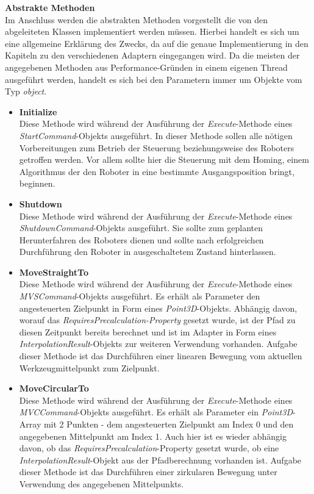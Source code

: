 \textbf{Abstrakte Methoden}\\
Im Anschluss werden die abstrakten Methoden vorgestellt die von den abgeleiteten Klassen implementiert werden müssen. Hierbei handelt es sich um eine allgemeine Erklärung des Zwecks, da auf die genaue Implementierung in den Kapiteln zu den verschiedenen Adaptern eingegangen wird. Da die meisten der angegebenen Methoden aus Performance-Gründen in einem eigenen Thread ausgeführt werden, handelt es sich bei den Parametern immer um Objekte vom Typ \textit{object}. 
\begin{itemize}
\item \textbf{Initialize}\\
Diese Methode wird während der Ausführung der \textit{Execute}-Methode eines \textit{StartCommand}-Objekts ausgeführt. In dieser Methode sollen alle nötigen Vorbereitungen zum Betrieb der Steuerung beziehungsweise des Roboters getroffen werden. Vor allem sollte hier die Steuerung mit dem Homing, einem Algorithmus der den Roboter in eine bestimmte Ausgangsposition bringt, beginnen.
\item \textbf{Shutdown}\\
Diese Methode wird während der Ausführung der \textit{Execute}-Methode eines \textit{ShutdownCommand}-Objekts ausgeführt. Sie sollte zum geplanten Herunterfahren des Roboters dienen und sollte nach erfolgreichen Durchführung den Roboter in ausgeschaltetem Zustand hinterlassen.
\item \textbf{MoveStraightTo}\\
Diese Methode wird während der Ausführung der \textit{Execute}-Methode eines \textit{MVSCommand}-Objekts ausgeführt. Es erhält als Parameter den angesteuerten Zielpunkt in Form eines \textit{Point3D}-Objekts. Abhängig davon, worauf das \textit{RequiresPrecalculation-Property} gesetzt wurde, ist der Pfad zu diesen Zeitpunkt bereits berechnet und ist im Adapter in Form eines \textit{InterpolationResult}-Objekts zur weiteren Verwendung vorhanden. Aufgabe dieser Methode ist das Durchführen einer linearen Bewegung vom aktuellen Werkzeugmittelpunkt zum Zielpunkt.
\item \textbf{MoveCircularTo}\\
Diese Methode wird während der Ausführung der \textit{Execute}-Methode eines \textit{MVCCommand}-Objekts ausgeführt. Es erhält als Parameter ein \textit{Point3D}-Array mit 2 Punkten - dem angesteuerten Zielpunkt am Index 0 und den angegebenen Mittelpunkt am Index 1. Auch hier ist es wieder abhängig davon, ob das \textit{RequiresPrecalculation}-Property gesetzt wurde, ob eine \textit{InterpolationResult}-Objekt aus der Pfadberechnung vorhanden ist. Aufgabe dieser Methode ist das Durchführen einer zirkularen Bewegung unter Verwendung des angegebenen Mittelpunkts.

\end{itemize}
